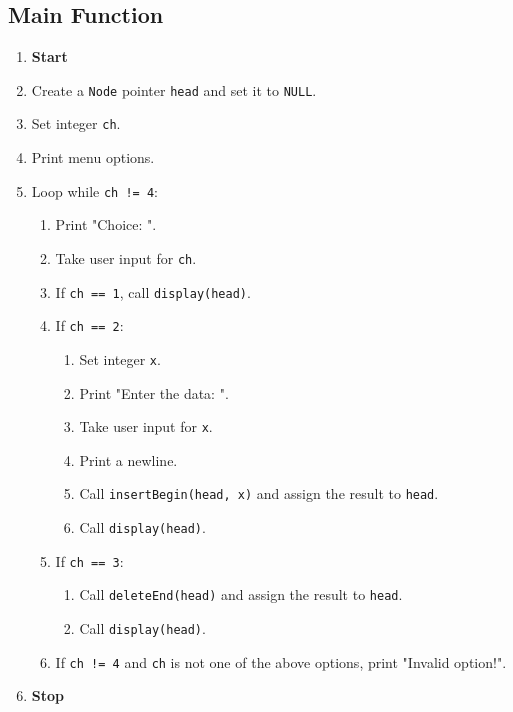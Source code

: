 {  \subsection{Main Function}
  \begin{enumerate}[label=\arabic*:,left=0pt]
    \item \textbf{Start}
    \item Create a \texttt{Node} pointer \texttt{head} and set it to \texttt{NULL}.
    \item Set integer \texttt{ch}.
    \item Print menu options.
    \item Loop while \texttt{ch != 4}:
          \begin{enumerate}[label=1.\arabic*:, start=1]
            \item Print "Choice: ".
            \item Take user input for \texttt{ch}.
            \item If \texttt{ch == 1}, call \texttt{display(head)}.
            \item If \texttt{ch == 2}:
                  \begin{enumerate}[label=3.\arabic*:, start=1]
                    \item Set integer \texttt{x}.
                    \item Print "Enter the data: ".
                    \item Take user input for \texttt{x}.
                    \item Print a newline.
                    \item Call \texttt{insertBegin(head, x)} and assign the result to \texttt{head}.
                    \item Call \texttt{display(head)}.
                  \end{enumerate}
            \item If \texttt{ch == 3}:
                  \begin{enumerate}[label=4.\arabic*:, start=1]
                    \item Call \texttt{deleteEnd(head)} and assign the result to \texttt{head}.
                    \item Call \texttt{display(head)}.
                  \end{enumerate}
            \item If \texttt{ch != 4} and \texttt{ch} is not one of the above options, print "Invalid option!".
          \end{enumerate}
    \item \textbf{Stop}
  \end{enumerate}
 }

